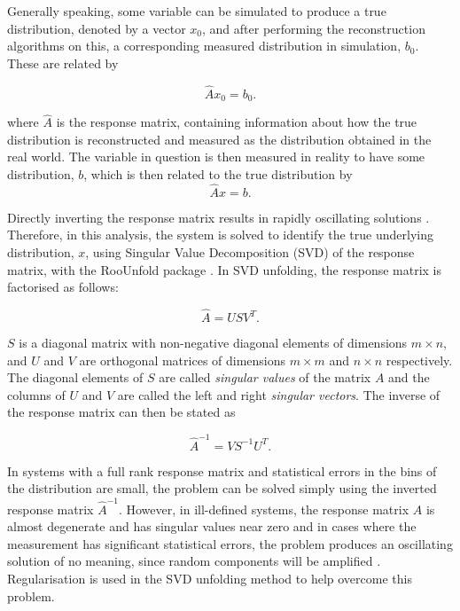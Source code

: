 Generally speaking, some variable can be simulated to produce a true distribution, denoted by a vector
$x_{0}$, and after performing the reconstruction algorithms on this, a corresponding measured distribution in
simulation, $b_{0}$. These are related by

\begin{equation}
\label{eq:unfolding_MC}
\hat{A} x_0 = b_0.
\end{equation}

where $\hat{A}$ is the response matrix, containing information about how the true distribution is
reconstructed and measured as the distribution obtained in the real world. The variable in question is then
measured in reality to have some distribution, $b$, which is then related to the true distribution by
\begin{equation}
\label{eq:unfolding_data}
\hat{A} x = b.
\end{equation}

Directly inverting the response matrix results in rapidly oscillating solutions \cite{Hocker:1995kb}.
Therefore, in this analysis, the system is solved to identify the true underlying distribution, $x$, using
Singular Value Decomposition (SVD) \cite{Hocker:1995kb} of the response matrix, with the RooUnfold package
\cite{Adye:2011gm}. In SVD unfolding, the response matrix is factorised as follows:

\begin{equation}
\hat{A} = USV^{T}.
\label{eq:response}
\end{equation}

$S$ is a diagonal matrix with non-negative diagonal elements of dimensions $m \times n$, and $U$ and $V$ are
orthogonal matrices of dimensions $m \times m$ and $n \times n$ respectively. The diagonal elements of $S$ are
called \textit{singular values} of the matrix $A$ and the columns of $U$ and $V$ are called the left and right
\textit{singular vectors}. The inverse of the response matrix can then be stated as

\begin{equation}
\hat{A}^{-1} = VS^{-1}U^{T}.
\label{eq:inverse_response}
\end{equation}

In systems with a full rank response matrix and statistical errors in the bins of the distribution are small,
the problem can be solved simply using the inverted response matrix $\hat{A}^{-1}$. However, in ill-defined
systems, the response matrix $A$ is almost degenerate and has singular values near zero and in cases where the
measurement has significant statistical errors, the problem produces an oscillating solution of no meaning,
since random components will be amplified \cite{Hocker:1995kb}. Regularisation is used in the SVD
unfolding method to help overcome this problem.


